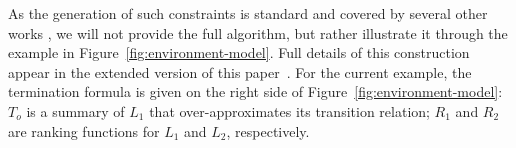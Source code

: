 \documentclass[preprint]{sigplanconf}
\theoremstyle{definition}
\begin{document}

As the generation of such constraints is standard and covered by several other works \cite{DBLP:conf/pldi/GrebenshchikovLPR12,DBLP:conf/pldi/GulwaniSV08}, 
we will not provide the full algorithm, but rather illustrate it through the example in Figure~\ref{fig:environment-model}.
Full details of this construction appear in the extended version of this paper~\cite{extended-version}.
For the current example, the termination formula is given on the right side of 
Figure~\ref{fig:environment-model}:
$T_o$ is a summary of $L_1$ that over-approximates its transition relation;
$R_1$ and $R_2$ are ranking functions for $L_1$ and $L_2$, respectively.


\end{document}
